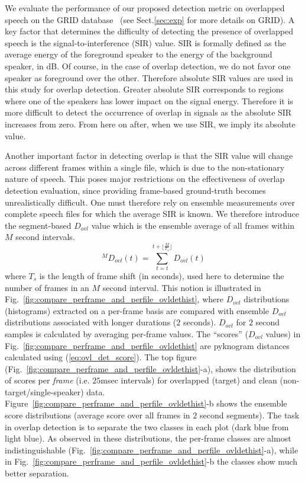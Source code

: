 {We evaluate the performance of our proposed detection metric on overlapped speech on the GRID database~\cite{SSC_link} (see Sect.\ref{sec:exp} for more details on GRID). 
A key factor that determines the difficulty of detecting the presence of overlapped speech is the signal-to-interference (SIR) value. 
SIR is formally defined as the average energy of the foreground speaker to the energy of the background speaker, in dB. 
Of course, in the case of overlap detection, we do not favor one speaker as foreground over the other. 
Therefore absolute SIR values are used in this study for overlap detection. 
Greater absolute SIR corresponds to regions where one of the speakers has lower impact on the signal energy. 
Therefore it is more difficult to detect the occurrence of overlap in signals as the absolute SIR increases from zero.  
From here on after, when we use SIR, we imply its absolute value. 

Another important factor in detecting overlap is that the SIR value will change across different frames within a single file, which is due to the non-stationary nature of speech. 
This poses major restrictions on the effectiveness of overlap detection evaluation, since providing frame-based ground-truth becomes unrealistically difficult. 
One must therefore rely on ensemble measurements over complete speech files for which the average SIR is known. 
We therefore introduce the segment-based $D_{ovl}$ value which is the ensemble average of all frames within $M$ second intervals. 
\begin{equation}
\label{eq:seg_dovl}
^{M}D_{ovl}(t) = \sum_{t = t}^{t+\lfloor \frac{M}{T_s} \rfloor} D_{ovl}(t)
\end{equation}
where $T_s$ is the length of frame shift (in seconds), used here to determine the number of frames in an $M$ second interval. 
This notion is illustrated in Fig.~\ref{fig:compare_perframe_and_perfile_ovldethist}, where $D_{ovl}$ distributions (histograms) extracted on a per-frame basis are compared with ensemble $D_{ovl}$ distributions associated with longer durations ($2$ seconds). 
$D_{ovl}$ for $2$ second samples is calculated by averaging per-frame values. 
The ``scores'' ($D_{ovl}$ values) in Fig.~\ref{fig:compare_perframe_and_perfile_ovldethist} are pyknogram distances calculated using (\ref{eq:ovl_det_score}). 
The top figure (Fig.~\ref{fig:compare_perframe_and_perfile_ovldethist}-a), shows the distribution of scores per {\it frame} (i.e. $25$msec intervals) for overlapped (target) and clean (non-target/single-speaker) data.  
Figure~\ref{fig:compare_perframe_and_perfile_ovldethist}-b shows the ensemble score distributions (average score over all frames in $2$ second segments). 
The task in overlap detection is to separate the two classes in each plot (dark blue from light blue). 
As observed in these distributions, the per-frame classes are almost indistinguishable (Fig.~\ref{fig:compare_perframe_and_perfile_ovldethist}-a), while in Fig.~\ref{fig:compare_perframe_and_perfile_ovldethist}-b the classes show much better separation. 


}
